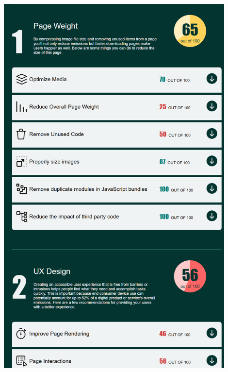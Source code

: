\documentclass[12pt,a4paper]{report}
\begin{document}
\begin{center}
    \includegraphics[width=0.9\textwidth]{imagenes/Ecograder_4.png}
\end{center}
\end{document}
